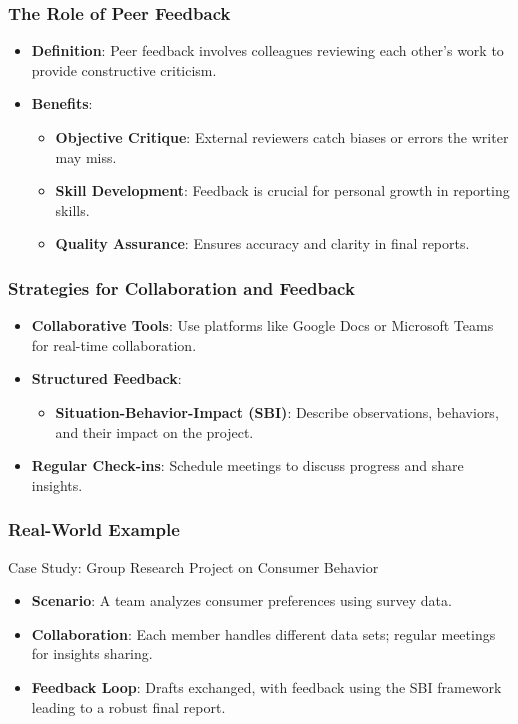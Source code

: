 \documentclass{beamer}
\begin{document}
\begin{frame}[fragile]
    \frametitle{The Role of Peer Feedback}
    \begin{itemize}
        \item \textbf{Definition}: Peer feedback involves colleagues reviewing each other's work to provide constructive criticism.
        \item \textbf{Benefits}:
        \begin{itemize}
            \item \textbf{Objective Critique}: External reviewers catch biases or errors the writer may miss.
            \item \textbf{Skill Development}: Feedback is crucial for personal growth in reporting skills.
            \item \textbf{Quality Assurance}: Ensures accuracy and clarity in final reports.
        \end{itemize}
    \end{itemize}
\end{frame}

\begin{frame}[fragile]
    \frametitle{Strategies for Collaboration and Feedback}
    \begin{itemize}
        \item \textbf{Collaborative Tools}: Use platforms like Google Docs or Microsoft Teams for real-time collaboration.
        \item \textbf{Structured Feedback}:
        \begin{itemize}
            \item \textbf{Situation-Behavior-Impact (SBI)}: Describe observations, behaviors, and their impact on the project.
        \end{itemize}
        \item \textbf{Regular Check-ins}: Schedule meetings to discuss progress and share insights.
    \end{itemize}
\end{frame}

\begin{frame}[fragile]
    \frametitle{Real-World Example}
    \begin{block}{Case Study: Group Research Project on Consumer Behavior}
        \begin{itemize}
            \item \textbf{Scenario}: A team analyzes consumer preferences using survey data.
            \item \textbf{Collaboration}: Each member handles different data sets; regular meetings for insights sharing.
            \item \textbf{Feedback Loop}: Drafts exchanged, with feedback using the SBI framework leading to a robust final report.
        \end{itemize}
    \end{block}
\end{frame}
\end{document}
